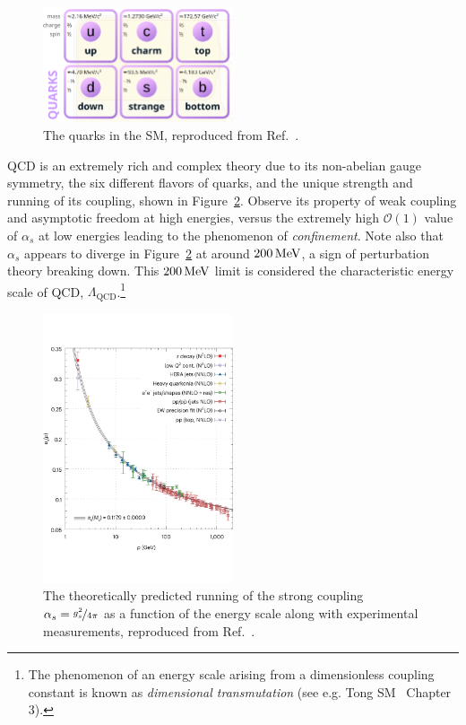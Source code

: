 \begin{figure}[ht]
	\centering
	\captionsetup{justification=centering}
	\includegraphics[width=0.5\textwidth]{figures/01-SM-03-SM/qcd/quarks.png}
	\caption{The quarks in the SM, reproduced from Ref.~\cite{enwiki:1238968997}.}
	\label{fig:01_sm_qcd_quarks}
\end{figure}

QCD is an extremely rich and complex theory due to its non-abelian gauge symmetry, the six different flavors of quarks, and the unique strength and running of its coupling, shown in Figure~\ref{fig:01_sm_qcd_running}.
Observe its property of weak coupling and asymptotic freedom at high energies, versus the extremely high $\mathcal O(1)$ value of $\alpha_s$ at low energies leading to the phenomenon of \textit{confinement}.
Note also that $\alpha_s$ appears to diverge in Figure~\ref{fig:01_sm_qcd_running} at around $200 \,\text{Me\hspace{-.08em}V}$, a sign of perturbation theory breaking down. 
This $200 \,\text{Me\hspace{-.08em}V}$ limit is considered the characteristic energy scale of QCD, $\Lambda_{\mathrm{QCD}}$.\footnote{The phenomenon of an energy scale arising from a dimensionless coupling constant  is known as \textit{dimensional transmutation} (see e.g. Tong SM~\cite{TongSM} Chapter 3).}

\begin{figure}[ht]
	\centering
	\includegraphics[width=0.5\textwidth]{figures/01-SM-03-SM/qcd/qcd_running}
	\caption{The theoretically predicted running of the strong coupling $\alpha_s = \cnicefrac{g_s^2}{4\pi}$ as a function of the energy scale along with experimental measurements, reproduced from Ref.~\cite{Boito:2023lzf}.}
	\label{fig:01_sm_qcd_running}
\end{figure}

